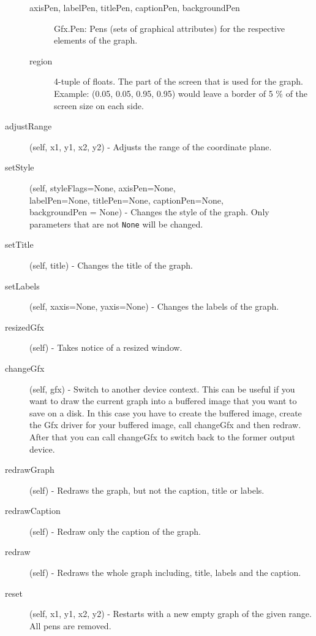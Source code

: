 \documentclass[12pt,a4paper,USenglish]{article}
\begin{document}
\begin{description}
\begin{description}
\item[axisPen, labelPen, titlePen, captionPen, backgroundPen] Gfx.Pen: 
	Pens (sets of graphical attributes) for the respective elements 
        of the graph.
\item[region] 4-tuple of floats. The part of the screen that is used 
	for the graph. Example: (0.05, 0.05, 0.95, 0.95) would leave a 
	border of 5 \% of the screen size on each side.

\end{description}

\item[adjustRange] (self, x1, y1, x2, y2) - Adjusts the range of the
  coordinate plane.

\item[setStyle] (self, styleFlags=None, axisPen=None,\\ 
      labelPen=None, titlePen=None, captionPen=None,\\
      backgroundPen = None) - Changes the style of the graph. 
      Only parameters that are not {\tt None} will be changed.

\item[setTitle] (self, title) - Changes the title of the graph.

\item[setLabels] (self, xaxis=None, yaxis=None) - Changes the labels of
  the graph.

\item[resizedGfx] (self) - Takes notice of a resized window.

\item[changeGfx] (self, gfx) - Switch to another device context. This
  can be useful if you want to draw the current graph into a buffered
  image that you want to save on a disk. In this case you have to
  create the buffered image, create the Gfx driver for your buffered
  image, call changeGfx and then redraw. After that you can call
  changeGfx to switch back to the former output device.

\item[redrawGraph] (self) - Redraws the graph, but not the caption,
  title or labels.

\item[redrawCaption] (self) - Redraw only the caption of the graph.

\item[redraw] (self) - Redraws the whole graph including, title, labels
  and the caption.

\item[reset] (self, x1, y1, x2, y2) - Restarts with a new empty graph
  of the given range. All pens are removed.


\end{description}
\end{document}
